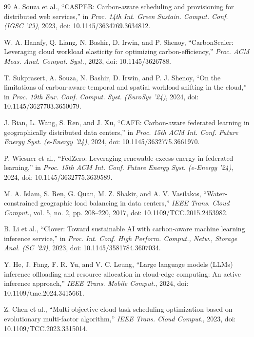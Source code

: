 \documentclass[conference]{IEEEtran}
\begin{document}
\begin{thebibliography}{99}
 A. Souza et al., ``CASPER: Carbon-aware scheduling and provisioning for distributed web services,'' in \textit{Proc. 14th Int. Green Sustain. Comput. Conf. (IGSC '23)}, 2023, doi: 10.1145/3634769.3634812.

 W. A. Hanafy, Q. Liang, N. Bashir, D. Irwin, and P. Shenoy, ``CarbonScaler: Leveraging cloud workload elasticity for optimizing carbon-efficiency,'' \textit{Proc. ACM Meas. Anal. Comput. Syst.}, 2023, doi: 10.1145/3626788.

 T. Sukprasert, A. Souza, N. Bashir, D. Irwin, and P. J. Shenoy, ``On the limitations of carbon-aware temporal and spatial workload shifting in the cloud,'' in \textit{Proc. 19th Eur. Conf. Comput. Syst. (EuroSys '24)}, 2024, doi: 10.1145/3627703.3650079.

 J. Bian, L. Wang, S. Ren, and J. Xu, ``CAFE: Carbon-aware federated learning in geographically distributed data centers,'' in \textit{Proc. 15th ACM Int. Conf. Future Energy Syst. (e-Energy '24)}, 2024, doi: 10.1145/3632775.3661970.

 P. Wiesner et al., ``FedZero: Leveraging renewable excess energy in federated learning,'' in \textit{Proc. 15th ACM Int. Conf. Future Energy Syst. (e-Energy '24)}, 2024, doi: 10.1145/3632775.3639589.

 M. A. Islam, S. Ren, G. Quan, M. Z. Shakir, and A. V. Vasilakos, ``Water-constrained geographic load balancing in data centers,'' \textit{IEEE Trans. Cloud Comput.}, vol. 5, no. 2, pp. 208--220, 2017, doi: 10.1109/TCC.2015.2453982.

 B. Li et al., ``Clover: Toward sustainable AI with carbon-aware machine learning inference service,'' in \textit{Proc. Int. Conf. High Perform. Comput., Netw., Storage Anal. (SC '23)}, 2023, doi: 10.1145/3581784.3607034.

 Y. He, J. Fang, F. R. Yu, and V. C. Leung, ``Large language models (LLMs) inference offloading and resource allocation in cloud-edge computing: An active inference approach,'' \textit{IEEE Trans. Mobile Comput.}, 2024, doi: 10.1109/tmc.2024.3415661.

 Z. Chen et al., ``Multi-objective cloud task scheduling optimization based on evolutionary multi-factor algorithm,'' \textit{IEEE Trans. Cloud Comput.}, 2023, doi: 10.1109/TCC.2023.3315014.


\end{thebibliography}
\end{document}
